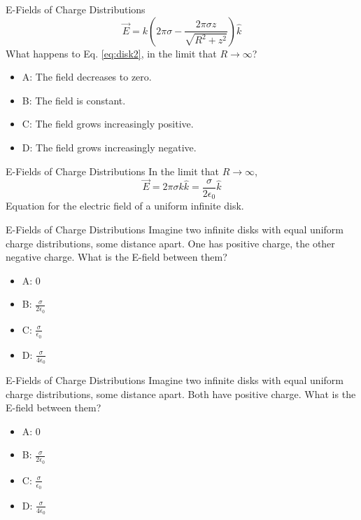 \documentclass{beamer}
\begin{document}
\begin{frame}{E-Fields of Charge Distributions}
\begin{equation}
\boxed{
\vec{E} = k\left(2\pi\sigma - \frac{2\pi\sigma z}{\sqrt{R^2 + z^2}} \right)\hat{k}} \label{eq:disk2}
\end{equation}
What happens to Eq. \ref{eq:disk2}, in the limit that $R \rightarrow \infty$?
\begin{itemize}
\item A: The field decreases to zero.
\item B: The field is constant.
\item C: The field grows increasingly positive.
\item D: The field grows increasingly negative.
\end{itemize}
\end{frame}

\begin{frame}{E-Fields of Charge Distributions}
In the limit that $R \rightarrow \infty$,
\begin{equation}
\vec{E} = 2\pi\sigma k \hat{k} = \frac{\sigma}{2\epsilon_0} \hat{k} \label{eq:disk3}
\end{equation}
Equation for the electric field of a uniform infinite disk.
\end{frame}

\begin{frame}{E-Fields of Charge Distributions}
Imagine two infinite disks with equal uniform charge distributions, some distance apart.  One has positive charge, the other negative charge.  What is the E-field between them?
\begin{itemize}
\item A: 0
\item B: $\frac{\sigma}{2\epsilon_0}$
\item C: $\frac{\sigma}{\epsilon_0}$
\item D: $\frac{\sigma}{4\epsilon_0}$
\end{itemize}
\end{frame}

\begin{frame}{E-Fields of Charge Distributions}
Imagine two infinite disks with equal uniform charge distributions, some distance apart.  Both have positive charge.  What is the E-field between them?
\begin{itemize}
\item A: 0
\item B: $\frac{\sigma}{2\epsilon_0}$
\item C: $\frac{\sigma}{\epsilon_0}$
\item D: $\frac{\sigma}{4\epsilon_0}$
\end{itemize}
\end{frame}
\end{document}
